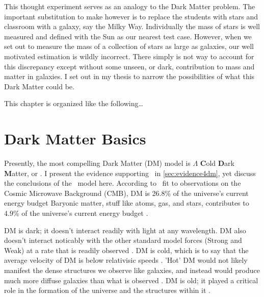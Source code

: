 This thought experiment serves as an analogy to the Dark Matter problem.
The important substitution to make however is to replace the students with stars and classroom with a galaxy, say the Milky Way.
Individually the mass of stars is well measured and defined with the Sun as our nearest test case.
However, when we set out to measure the mass of a collection of stars as large as galaxies, our well motivated estimation is wildly incorrect.
There simply is not way to account for this discrepancy except without some unseen, or dark, contribution to mass and matter in galaxies.
I set out in my thesis to narrow the possibilities of what this Dark Matter could be.

This chapter is organized like the following\dots
{}

\section{Dark Matter Basics\label{sec:basicDM}}

Presently, the most compelling Dark Matter (DM) model is $\Lambda$ \textbf{C}old \textbf{D}ark \textbf{M}atter, or \lcdm.
I present the evidence supporting \lcdm~in \ref{sec:evidence4dm}, yet discuss the conclusions of the \lcdm~model here.
According to \lcdm~fit to observations on the Cosmic Microwave Background (CMB), DM is 26.8\% of the universe's current energy budget
Baryonic matter, stuff like atoms, gas, and stars, contributes to 4.9\% of the universe's current energy budget \cite{Greene:cosmology_dm,Young:cosmology_dm,Bertone:particleDM}.


DM is dark; it doesn't interact readily with light at any wavelength.
DM also doesn't interact noticably with the other standard model forces (Strong and Weak) at a rate that is readily observed \cite{Bertone:particleDM}.
DM is cold, which is to say that the average velocity of DM is below relativisic speeds \cite{Greene:cosmology_dm}.
'Hot' DM would not likely manifest the dense structures we observe like galaxies, and instead would produce much more diffuse galaxies than what is observed \cite{Bertone:particleDM,Greene:cosmology_dm}.
DM is old; it played a critical role in the formation of the universe and the structures within it \cite{Greene:cosmology_dm,Young:cosmology_dm}.

